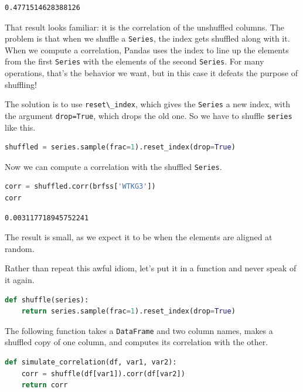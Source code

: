 \begin{lstlisting}[style=output]
0.4771514628388126
\end{lstlisting}

That result looks familiar: it is the correlation of the unshuffled
columns. The problem is that when we shuffle a
\passthrough{\lstinline!Series!}, the index gets shuffled along with it.
When we compute a correlation, Pandas uses the index to line up the
elements from the first \passthrough{\lstinline!Series!} with the
elements of the second \passthrough{\lstinline!Series!}. For many
operations, that's the behavior we want, but in this case it defeats the
purpose of shuffling!

The solution is to use \passthrough{\lstinline!reset\_index!}, which
gives the \passthrough{\lstinline!Series!} a new index, with the
argument \passthrough{\lstinline!drop=True!}, which drops the old one.
So we have to shuffle \passthrough{\lstinline!series!} like this.

\begin{lstlisting}[language=Python,style=source]
shuffled = series.sample(frac=1).reset_index(drop=True)
\end{lstlisting}

Now we can compute a correlation with the shuffled
\passthrough{\lstinline!Series!}.

\begin{lstlisting}[language=Python,style=source]
corr = shuffled.corr(brfss['WTKG3'])
corr
\end{lstlisting}

\begin{lstlisting}[style=output]
0.003117718945752241
\end{lstlisting}

The result is small, as we expect it to be when the elements are aligned
at random.

Rather than repeat this awful idiom, let's put it in a function and
never speak of it again.

\begin{lstlisting}[language=Python,style=source]
def shuffle(series):
    return series.sample(frac=1).reset_index(drop=True)
\end{lstlisting}

The following function takes a \passthrough{\lstinline!DataFrame!} and
two column names, makes a shuffled copy of one column, and computes its
correlation with the other.

\begin{lstlisting}[language=Python,style=source]
def simulate_correlation(df, var1, var2):
    corr = shuffle(df[var1]).corr(df[var2])
    return corr
\end{lstlisting}

